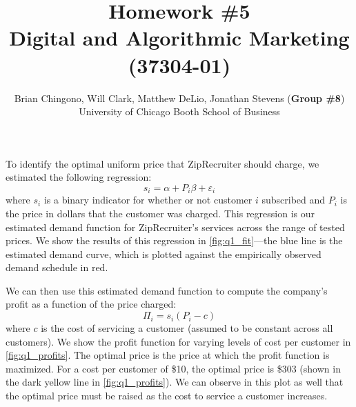 



\title{Homework \#5\\
Digital and Algorithmic Marketing (37304-01)}
\author{
Brian Chingono, Will Clark, Matthew DeLio, Jonathan Stevens (\textbf{Group \#8})\\
University of Chicago Booth School of Business}

\maketitle

\section{} \label{sec:q1} %
To identify the optimal uniform price that ZipRecruiter should charge, we estimated the following regression:
\[ s_i = \alpha + P_i \beta + \varepsilon_i \]
where $s_i$ is a binary indicator for whether or not customer $i$ subscribed and $P_i$ is the price in dollars that the customer was charged. This regression is our estimated demand function for ZipRecruiter's services across the range of tested prices. We show the results of this regression in \vref{fig:q1_fit}---the blue line is the estimated demand curve, which is plotted against the empirically observed demand schedule in red.


We can then use this estimated demand function to compute the company's profit as a function of the price charged:
\[ \Pi_i = s_i \left( P_i - c \right) \]
where $c$ is the cost of servicing a customer (assumed to be constant across all customers). We show the profit function for varying levels of cost per customer in \vref{fig:q1_profits}. The optimal price is the price at which the profit function is maximized. For a cost per customer of \$10, the optimal price is \$303 (shown in the dark yellow line in \cref{fig:q1_profits}). We can observe in this plot as well that the optimal price must be raised as the cost to service a customer increases.


